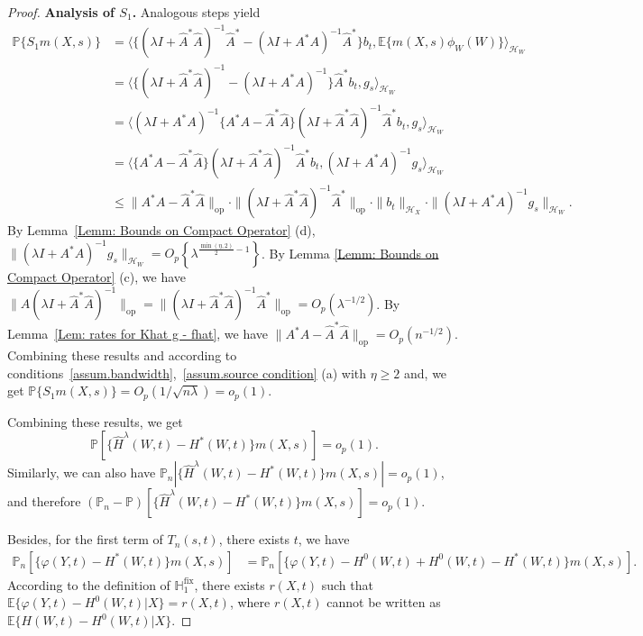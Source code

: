 \documentclass[
  12pt]{article}
\def\mE{\mathbb{E}}
\def\mH{\mathbb{H}}
\def\mE{\mathbb{E}}
\begin{document}
\begin{proof}
\textbf{Analysis of $S_1$.} Analogous steps yield
\begin{align*}
	\mathbb{P} \{S_1m(X,s) \}&=\langle \{(\lambda I+\widehat{A}^*\widehat{A})^{-1}\widehat{A}^*-(\lambda I+A^*A)^{-1}\widehat{A}^*\}b_t,\mathbb{E} \{ m(X,s) \phi_W(W) \} \rangle_{\mathcal{H}_W}\\
	&=\langle \{(\lambda I+\widehat{A}^*\widehat{A})^{-1}-(\lambda I+A^*A)^{-1}\}\widehat{A}^*b_t,g_s \rangle_{\mathcal{H}_W}\\
	&=\langle (\lambda I+A^*A)^{-1}\{A^*A-\widehat{A}^*\widehat{A}\}(\lambda I+\widehat{A}^*\widehat{A})^{-1}\widehat{A}^*b_t,g_s \rangle_{\mathcal{H}_W}\\
	&=\langle \{A^*A-\widehat{A}^*\widehat{A}\}(\lambda I+\widehat{A}^*\widehat{A})^{-1}\widehat{A}^*b_t,(\lambda I+A^*A)^{-1}g_s \rangle_{\mathcal{H}_W}\\
	&\le \| A^*A-\widehat{A}^*\widehat{A} \|_{\mathrm{op}}\cdot \| (\lambda I+\widehat{A}^*\widehat{A})^{-1}\widehat{A}^* \|_{\mathrm{op}} \cdot \| b_t \|_{\mathcal{H}_X}\cdot \| (\lambda I+A^*A)^{-1}g_s\|_{\mathcal{H}_W}.
\end{align*}
By Lemma~\ref{Lemm: Bounds on Compact Operator} (d), $\| (\lambda I+A^*A)^{-1}g_s \|_{\mathcal{H}_W}=O_p\left\{\lambda^{\frac{\min(\eta,2)}{2}-1}\right\}$. By Lemma \ref{Lemm: Bounds on Compact Operator} (c), we have $\|\widehat{A}(\lambda I +\widehat{A}^*\widehat{A} )^{-1}\|_{\mathrm{op}}=\|(\lambda I + \widehat{A}^*\widehat{A} )^{-1}\widehat{A}^*\|_{\mathrm{op}}=O_p(\lambda^{-1/2})$. By Lemma~\ref{Lem: rates for Khat g - fhat}, we have $ \| A^*A-\widehat{A}^*\widehat{A}\|_{\mathrm{op}}=O_p(n^{-1/2})$. Combining these results and according to conditions~\ref{assum.bandwidth},~\ref{assum.source condition} (a) with $\eta \ge 2$ and, we get $\mathbb{P} \{S_1m(X,s) \}=O_p(1/\sqrt{n\lambda})=o_p(1)$.

Combining these results, we get 
$$
\mathbb{P} \left[ \{\widehat{H}^{\lambda}(W,t)-H^*(W,t)\}m(X,s) \right]=o_p(1).
$$
Similarly, we can also have $\mathbb{P}_n \left|\{\widehat{H}^{\lambda}(W,t)-H^*(W,t)\}m(X,s) \right| = o_p(1)$, and therefore $(\mathbb{P}_n-\mathbb{P} )\left[\{\widehat{H}^{\lambda}(W,t)-H^*(W,t)\}m(X,s) \right] = o_p(1)$. 


Besides, for the first term of $T_n(s,t)$, there exists $t$, we have  
\begin{align*}
	\mathbb{P}_n\left[ \{\varphi (Y,t)-H^*(W,t)\}m(X,s) \right] &=\mathbb{P}_n\left[ \{\varphi (Y,t)-H^0(W,t)+H^0(W,t)-H^*(W,t)\}m(X,s) \right].
\end{align*}
According to the definition of $\mH_1^{\mathrm{fix}}$, there exists $r(X,t)$ such that $\mathbb{E} \{ \varphi ( Y,t ) -H^0( W,t)|X\} = r(X,t)$, where $r(X,t)$ cannot be written as $\mE\{ H(W,t) -H^0( W,t)|X\}$.


\end{proof}
\end{document}
